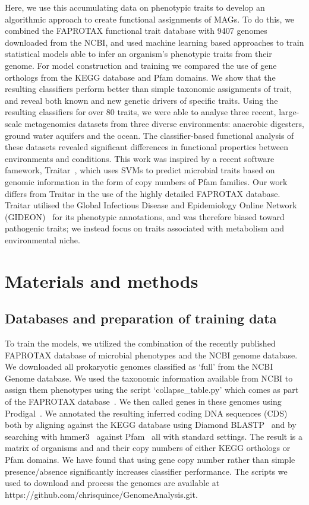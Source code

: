 \documentclass[10pt,letterpaper]{article}
\begin{document}
Here, we use this accumulating data on phenotypic traits to develop an algorithmic approach to create functional assignments of MAGs. To do this, we combined the FAPROTAX functional trait database with 9407 genomes downloaded from the NCBI, and used machine learning based approaches to train statistical models able to infer an organism’s phenotypic traits from their genome. For model construction and training we compared the use of gene orthologs from the KEGG database and Pfam domains. We show that the resulting classifiers perform better than simple taxonomic assignments of trait, and reveal both known and new genetic drivers of specific traits. Using the resulting classifiers for over 80 traits, we were able to analyse three recent, large-scale metagenomics datasets from three diverse environments: anaerobic digesters, ground water aquifers and the ocean. The classifier-based functional analysis of these datasets revealed significant differences in functional properties between environments and conditions. This work was inspired by a
recent software famework, Traitar~\cite{Weimann2016}, which uses SVMs to predict
microbial traits based on genomic information in the form of copy numbers of Pfam families. Our work differs from Traitar in the use of the highly detailed FAPROTAX database. Traitar utilised the Global Infectious Disease and Epidemiology Online Network
(GIDEON)~\cite{Berger2005} for its phenotypic annotations, and was therefore biased
toward pathogenic traits; we instead focus on traits associated with metabolism and
environmental niche.


\section*{Materials and methods}
\subsection*{Databases and preparation of training data}
To train the models, we utilized the combination of the recently published FAPROTAX database of microbial phenotypes and the NCBI genome database. We downloaded all prokaryotic genomes classified as `full' from the NCBI Genome database. We used the taxonomic information available from NCBI to assign them phenotypes using the script `collapse\_table.py' which comes as part of the FAPROTAX database~\cite{Louca2016}. We then called genes in these genomes using Prodigal~\cite{Hyatt2010}. We annotated the resulting inferred coding DNA sequences (CDS) both by aligning against the KEGG database using Diamond BLASTP~\cite{Buchfink2014} and by searching with hmmer3~\cite{Eddy2011} against Pfam~\cite{Finn2016} all with standard settings. The result is a matrix of organisms and and their copy numbers of either KEGG orthologs or Pfam domains. We have found that using gene copy number rather than simple presence/absence significantly increases classifier performance. The scripts we used to download and process the genomes are available at https://github.com/chrisquince/GenomeAnalysis.git.
\end{document}
